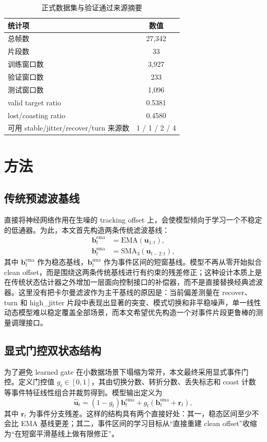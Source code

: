 ﻿\documentclass[lettersize,journal]{IEEEtran}
\begin{document}
\begin{table}[!t]
\caption{正式数据集与验证通过来源摘要\label{tab:data_summary}}
\centering
\begin{tabular}{lc}
\toprule
统计项 & 数值 \\
\midrule
总帧数 & 27,342 \\
片段数 & 33 \\
训练窗口数 & 3,927 \\
验证窗口数 & 233 \\
测试窗口数 & 1,096 \\
valid target ratio & 0.5381 \\
lost/coasting ratio & 0.4580 \\
可用 stable/jitter/recover/turn 来源数 & 1 / 1 / 2 / 4 \\
\bottomrule
\end{tabular}
\end{table}

\section{方法}
\subsection{传统预滤波基线}
直接将神经网络作用在生噪的 tracking offset 上，会使模型倾向于学习一个不稳定的低通器。为此，本文首先构造两条传统滤波基线：
\begin{align}
\mathbf{b}^{\mathrm{ema}}_t &= \mathrm{EMA}(\mathbf{u}_{1:t}),\\
\mathbf{b}^{\mathrm{sma}}_t &= \mathrm{SMA}_3(\mathbf{u}_{t-2:t}),
\end{align}
其中 $\mathbf{b}^{\mathrm{ema}}_t$ 作为稳态基线，$\mathbf{b}^{\mathrm{sma}}_t$ 作为事件区间的短窗基线。模型不再从零开始拟合 clean offset，而是围绕这两条传统基线进行有约束的残差修正；这种设计本质上是在传统状态估计器之外增加一层面向控制接口的补偿器，而不是直接替换经典滤波器\cite{kalman1960new,barshalom2001estimation}。这里没有把卡尔曼滤波作为主干基线的原因是：当前偏差测量在 recover、turn 和 high\_jitter 片段中表现出显著的突变、模式切换和非平稳噪声，单一线性动态模型难以稳定覆盖全部场景，而本文希望优先构造一个对事件片段更鲁棒的测量调理接口。

\subsection{显式门控双状态结构}
为了避免 learned gate 在小数据场景下塌缩为常开，本文最终采用显式事件门控。定义门控值 $g_t\in[0,1]$，其由切换分数、转折分数、丢失标志和 coast 计数等事件特征线性组合并裁剪得到。模型输出定义为
\begin{equation}
\hat{\mathbf{u}}_t = (1-g_t)\mathbf{b}^{\mathrm{ema}}_t + g_t\left(\mathbf{b}^{\mathrm{sma}}_t + \mathbf{r}_t\right),
\end{equation}
其中 $\mathbf{r}_t$ 为事件分支残差。这样的结构具有两个直接好处：其一，稳态区间至少不会比 EMA 基线更差；其二，事件区间的学习目标从“直接重建 clean offset”收缩为“在短窗平滑基线上做有限修正”。
\end{document}
